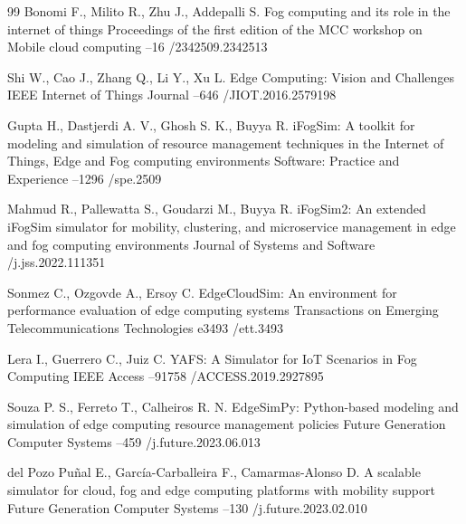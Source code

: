 \begin{thebibliography}{99}
\by Bonomi F., Milito R., Zhu J., Addepalli S.
\paper Fog computing and its role in the internet of things
\inbook Proceedings of the first edition of the MCC workshop on Mobile cloud computing
--16
/2342509.2342513

\by Shi W., Cao J., Zhang Q., Li Y., Xu L.
\paper Edge Computing: Vision and Challenges
\jour IEEE Internet of Things Journal
--646
/JIOT.2016.2579198

\by Gupta H., Dastjerdi A. V., Ghosh S. K., Buyya R.
\paper iFogSim: A toolkit for modeling and simulation of resource management techniques in the Internet of Things, Edge and Fog computing environments
\jour Software: Practice and Experience
--1296
/spe.2509

\by Mahmud R., Pallewatta S., Goudarzi M., Buyya R.
\paper iFogSim2: An extended iFogSim simulator for mobility, clustering, and microservice management in edge and fog computing environments
\jour Journal of Systems and Software
/j.jss.2022.111351

\by Sonmez C., Ozgovde A., Ersoy C.
\paper EdgeCloudSim: An environment for performance evaluation of edge computing systems
\jour Transactions on Emerging Telecommunications Technologies
\pages e3493
/ett.3493

\by Lera I., Guerrero C., Juiz C.
\paper YAFS: A Simulator for IoT Scenarios in Fog Computing
\jour IEEE Access
--91758
/ACCESS.2019.2927895

\by Souza P. S., Ferreto T., Calheiros R. N.
\paper EdgeSimPy: Python-based modeling and simulation of edge computing resource management policies
\jour Future Generation Computer Systems
--459
/j.future.2023.06.013

\by del Pozo Pu\~nal E., Garc\'ia-Carballeira F., Camarmas-Alonso D.
\paper A scalable simulator for cloud, fog and edge computing platforms with mobility support
\jour Future Generation Computer Systems
--130
/j.future.2023.02.010


\end{thebibliography}
